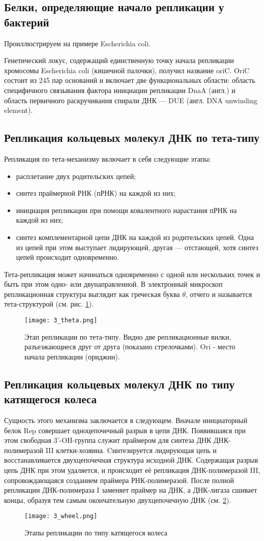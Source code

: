 \subsection{Белки, определяющие начало репликации у бактерий}

Проиллюстрируем на примере Escherichia coli.

Генетический локус, содержащий единственную точку начала репликации хромосомы Escherichia coli (кишечной палочки), получил название oriC. OriC состоит из 245 пар оснований и включает две функциональных области: область специфичного связывания фактора инициации репликации DnaA (англ.) и область первичного раскручивания спирали ДНК — DUE (англ. DNA unwinding element). 

\subsection{Репликация кольцевых молекул ДНК по тета-типу}
Репликация по тета-механизму включает в себя следующие этапы:
\begin{itemize}
    \item 
    расплетание двух родительских цепей;
    \item
    синтез праймерной РНК (пРНК) на каждой из них;
    \item
    инициация репликации при помощи ковалентного нарастания пРНК на каждой из них;
    \item
    синтез комплементарной цепи ДНК на каждой из родительских цепей. Одна из цепей при этом выступает лидирующей, другая — отстающей, хотя синтез цепей происходит одновременно.
\end{itemize}

Тета-репликация может начинаться одновременно с одной или нескольких точек и быть при этом одно- или двунаправленной. В электронный микроскоп репликационная структура выглядит как греческая буква \(\theta\), отчего и называется тета-структурой (см. рис. \ref{fig:3_theta}).

\begin{figure}[h!]
    \centering
    \texttt{[image: 3\_theta.png]}
    \caption{Этап репликации по тета-типу. Видно две репликационные вилки, разъезжающиеся друг от друга (показано стрелочками). Ori - место начала репликации (ориджин).}
    \label{fig:3_theta}
\end{figure}

\subsection{Репликация кольцевых молекул ДНК по типу катящегося колеса}
Сущность этого механизма заключается в следующем. Вначале инициаторный белок Rep совершает одноцепочечный разрыв в цепи ДНК. Появившаяся при этом свободная 3'-OH-группа служит праймером для синтеза ДНК ДНК-полимеразой III клетки-хозяина. Cинтезируется лидирующая цепь и восстанавливается двухцепочечная структура исходной ДНК. Содержащая разрыв цепь ДНК при этом удаляется, и происходит её репликация ДНК-полимеразой III, сопровождающаяся созданием праймера РНК-полимеразой. После полной репликации ДНК-полимераза I заменяет праймер на ДНК, а ДНК-лигаза сшивает концы, образуя тем самым окончательную двухцепочечную ДНК (см. \ref{fig:3_wheel}).

\begin{figure}[h!]
    \centering
    \texttt{[image: 3\_wheel.png]}
    \caption{Этапы репликации по типу катящегося колеса}
    \label{fig:3_wheel}
\end{figure}
